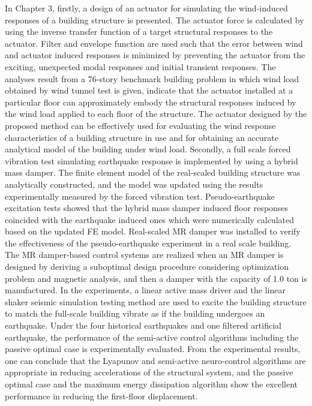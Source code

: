 In Chapter 3, firstly, a design of an actuator for simulating the wind-induced responses of a building structure is presented. The actuator force is calculated by using the inverse transfer function of a target structural responses to the actuator. Filter and envelope function are used such that the error between wind and actuator induced responses is minimized by preventing the actuator from the exciting, unexpected modal responses and initial transient responses. The analyses result from a 76-story benchmark building problem in which wind load obtained by wind tunnel test is given, indicate that the actuator installed at a particular floor can approximately embody the structural responses induced by the wind load applied to each floor of the structure. The actuator designed by the proposed method can be effectively used for evaluating the wind response characteristics of a building structure in use and for obtaining an accurate analytical model of the building under wind load. Secondly, a full scale forced vibration test simulating earthquake response is implemented by using a hybrid mass damper. The finite element model of the real-scaled building structure was analytically constructed, and the model was updated using the results experimentally measured by the forced vibration test. Pseudo-earthquake excitation tests showed that the hybrid mass damper induced floor responses coincided with the earthquake induced ones which were numerically calculated based on the updated FE model. Real-scaled MR damper was installed to verify the effectiveness of the pseudo-earthquake experiment in a real scale building. The MR damper-based control systems are realized when an MR damper is designed by deriving a suboptimal design procedure considering optimization problem and magnetic analysis, and then a damper with the capacity of 1.0 ton is manufactured. In the experiments, a linear active mass driver and the linear shaker seismic simulation testing method are used to excite the building structure to match the full-scale building vibrate as if the building undergoes an earthquake. Under the four historical earthquakes and one filtered artificial earthquake, the performance of the semi-active control algorithms including the passive optimal case is experimentally evaluated. From the experimental results, one can conclude that the Lyapunov and semi-active neuro-control algorithms are appropriate in reducing accelerations of the structural system, and the passive optimal case and the maximum energy dissipation algorithm show the excellent performance in reducing the first-floor displacement.

